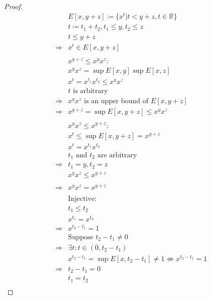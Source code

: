 \documentclass{article}
\begin{document}
~

\begin{proof}
    \begin{align*}
        &E[x,y+z]\coloneqq\{x^t|t<y+z,t\in\mathbb{R}\}\\
        &t\coloneqq t_1+t_2,t_1\leqslant y,t_2\leqslant z\\
        &t\leqslant y+z\\
        \Rightarrow&x^t\in E[x,y+z]\\
        &\\
        &x^{y+z}\leqslant x^yx^z:\\
        &x^yx^z=\sup E[x,y]\sup E[x,z]\\
        &x^t=x^{t_1}x^{t_2}\leqslant x^yx^z\\
        &t\text{ is arbitrary}\\
        \Rightarrow&x^yx^z\text{ is an upper bound of }E[x,y+z]\\
        \Rightarrow&x^{y+z}=\sup E[x,y+z]\leqslant x^yx^z\\
        &\\
        &x^yx^z\leqslant x^{y+z}:\\
        &x^t\leqslant \sup E[x,y+z]=x^{y+z}\\
        &x^t=x^{t_1}x^{t_2}\\
        &t_1\text{ and }t_2\text{ are arbitrary}\\
        \Rightarrow&t_1=y,t_2=z\\
        &x^yx^z\leqslant x^{y+z}\\
        &\\
        \Rightarrow&x^yx^z=x^{y+z}\\
        &\\
        &\text{Injective}:\\
        &t_1\leqslant t_2\\
        &x^{t_1}=x^{t_2}\\
        \Rightarrow&x^{t_2-t_1}=1\\
        &\text{Suppose }t_2-t_1\ne0\\
        \Rightarrow&\exists t:t\in(0,t_2-t_1)\\
        &x^{t_2-t_1}=\sup E[x,t_2-t_1]\ne1\nLeftrightarrow x^{t_2-t_1}=1\\
        \Rightarrow&t_2-t_1=0\\
        &t_1=t_2\\
    \end{align*}
\end{proof}
\end{document}
